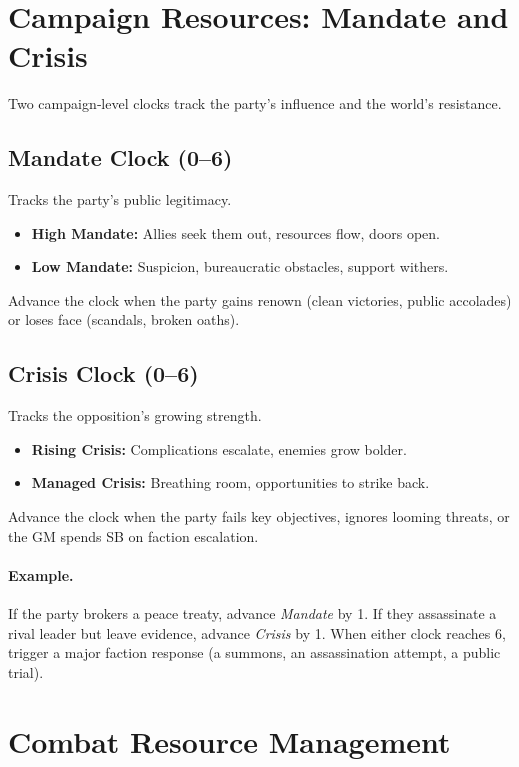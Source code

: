 \section{Campaign Resources: Mandate and Crisis}
\label{sec:campaign-resources}

Two campaign‑level clocks track the party’s influence and the world’s resistance.

\subsection{Mandate Clock (0–6)}
\label{subsec:mandate}

Tracks the party’s public legitimacy.
\begin{itemize}
  \item \textbf{High Mandate:} Allies seek them out, resources flow, doors open.
  \item \textbf{Low Mandate:} Suspicion, bureaucratic obstacles, support withers.
\end{itemize}
Advance the clock when the party gains renown (clean victories, public accolades) or loses face (scandals, broken oaths).

\subsection{Crisis Clock (0–6)}
\label{subsec:crisis}

Tracks the opposition’s growing strength.
\begin{itemize}
  \item \textbf{Rising Crisis:} Complications escalate, enemies grow bolder.
  \item \textbf{Managed Crisis:} Breathing room, opportunities to strike back.
\end{itemize}
Advance the clock when the party fails key objectives, ignores looming threats, or the GM spends SB on faction escalation.

\paragraph{Example.}
If the party brokers a peace treaty, advance \textit{Mandate} by 1. If they assassinate a rival leader but leave evidence, advance \textit{Crisis} by 1. When either clock reaches 6, trigger a major faction response (a summons, an assassination attempt, a public trial).

\section{Combat Resource Management}
\label{sec:combat-resources}

